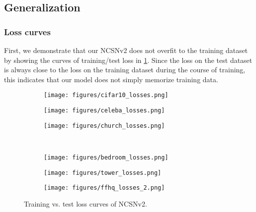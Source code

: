 \documentclass{article}
\begin{document}
\subsection{Generalization}\label{app:generalization}
\subsubsection{Loss curves}
First, we demonstrate that our NCSNv2 does not overfit to the training dataset by showing the curves of training/test loss in \cref{fig:ncsnv2_train_test_curves}. Since the loss on the test dataset is always close to the loss on the training dataset during the course of training, this indicates that our model does not simply memorize training data.
\begin{figure}[H]
    \centering
    \begin{subfigure}{0.32\textwidth}
        \texttt{[image: figures/cifar10\_losses.png]}
        \caption{}
    \end{subfigure}
    \begin{subfigure}{0.32\textwidth}
        \texttt{[image: figures/celeba\_losses.png]}
        \caption{}
    \end{subfigure}
    \begin{subfigure}{0.32\textwidth}
        \texttt{[image: figures/church\_losses.png]}
        \caption{}
    \end{subfigure}\\
    \begin{subfigure}{0.32\textwidth}
        \texttt{[image: figures/bedroom\_losses.png]}
        \caption{}
    \end{subfigure}
    \begin{subfigure}{0.32\textwidth}
        \texttt{[image: figures/tower\_losses.png]}
        \caption{}
    \end{subfigure}
    \begin{subfigure}{0.32\textwidth}
        \texttt{[image: figures/ffhq\_losses\_2.png]}
        \caption{}
    \end{subfigure}
    \caption{Training vs. test loss curves of NCSNv2.}
    \label{fig:ncsnv2_train_test_curves}
\end{figure}
\end{document}
